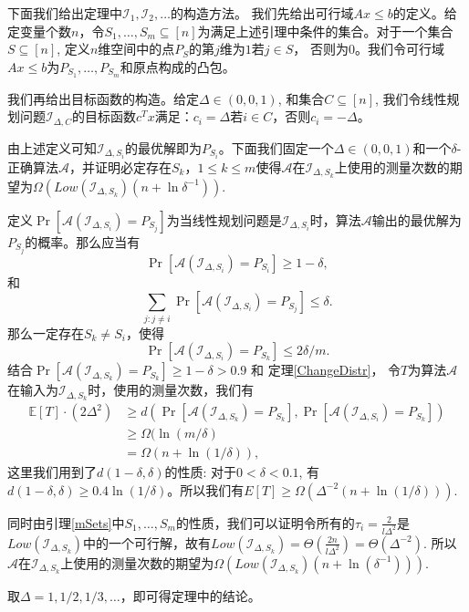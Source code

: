   下面我们给出定理中$\mathcal{I}_1, \mathcal{I}_2, \dots$的构造方法。
  我们先给出可行域$Ax\le b$的定义。给定变量个数$n$，令$S_1,\dots,S_m \subseteq [n]$为满足上述引理中条件的集合。对于一个集合$S\subseteq [n]$, 定义$n$维空间中的点$P_S$的第$j$维为$1$若$j\in S$， 否则为$0$。我们令可行域$Ax\le b$为$P_{S_1},\dots, P_{S_m}$和原点构成的凸包。
  
  我们再给出目标函数的构造。给定$\Delta \in (0, 0,1)$, 和集合$C\subseteq [n]$, 我们令线性规划问题$\mathcal{I}_{\Delta, C}$的目标函数$c^T x$满足：$c_i = \Delta$若$i\in C$，否则$c_i = - \Delta$。
  
  由上述定义可知$\mathcal{I}_{\Delta, S_i}$的最优解即为$P_{S_i}$。下面我们固定一个$\Delta\in (0,0,1)$和一个$\delta$-正确算法$\mathcal{A}$，并证明必定存在$S_k$，$1\le k \le m$使得$\mathcal{A}$在$\mathcal{I}_{\Delta, S_k}$上使用的测量次数的期望为$\Omega\left(Low(\mathcal{I}_{\Delta, S_k})(n+\ln \delta^{-1}) \right).$
        
 定义$\Pr[\mathcal{A}(\mathcal{I}_{\Delta, S_i}) = P_{S_j}]$为当线性规划问题是$\mathcal{I}_{\Delta, S_i}$时，算法$\mathcal{A}$输出的最优解为$P_{S_j}$的概率。那么应当有
 \[
 \Pr[\mathcal{A}(\mathcal{I}_{\Delta, S_i}) = P_{S_i}] \ge 1-\delta,
 \]
 和
 \[
 \sum_{j: j\neq i} \Pr[\mathcal{A}(\mathcal{I}_{\Delta, S_i}) = P_{S_j}] \le \delta.
 \]
 那么一定存在$S_k\neq S_i$，使得
 \[
	\Pr[\mathcal{A}(\mathcal{I}_{\Delta, S_i}) = P_{S_k}] \le 2\delta/m.
 \]
 结合$\Pr[\mathcal{A}(\mathcal{I}_{\Delta, S_k}) = P_{S_k}] \ge 1 - \delta> 0.9$ 和 定理\ref{ChangeDistr}， 令$T$为算法$\mathcal{A}$在输入为$\mathcal{I}_{\Delta,S_k}$时，使用的测量次数，我们有
 \begin{align*}
\mathbb{E}[T]\cdot (2 \Delta^2) &\ge d\left(\Pr[\mathcal{A}(\mathcal{I}_{\Delta, S_k}) = P_{S_k}],\Pr[\mathcal{A}(\mathcal{I}_{\Delta, S_i}) = P_{S_k}]\right) \\
&\ge \Omega(\ln(m/\delta)\\
& = \Omega(n + \ln(1/\delta)),
\end{align*}
这里我们用到了$d(1-\delta,\delta)$的性质: 对于$0<\delta<0.1$, 有$d(1-\delta,\delta)\ge 0.4 \ln(1/\delta)$。所以我们有$E[T]\ge \Omega\left(\Delta^{-2}(n + \ln(1/\delta))\right)$.

同时由引理\ref{mSets}中$S_1,\dots, S_m$的性质，我们可以证明令所有的$\tau_i = \frac{2}{l\Delta^2}$是$Low(\mathcal{I}_{\Delta, S_k})$中的一个可行解，故有$Low(\mathcal{I}_{\Delta, S_k})=\Theta(\frac{2n}{l\Delta^2}) = \Theta(\Delta^{-2})$. 
所以$\mathcal{A}$在$\mathcal{I}_{\Delta, S_k}$上使用的测量次数的期望为$\Omega\left(Low(\mathcal{I}_{\Delta, S_k})(n+\ln (\delta^{-1})) \right).$

取$\Delta = 1, 1/2, 1/3, \dots$，即可得定理中的结论。